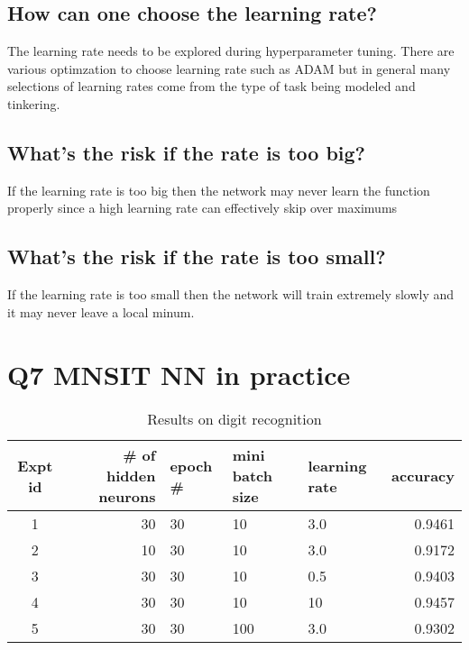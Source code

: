\documentclass[11pt]{article}
\begin{document}
\subsection{How can one choose the learning rate?}
The learning rate needs to be explored during hyperparameter tuning. There are various optimzation to choose learning rate such as ADAM but in general many selections of learning rates come from the type of task being modeled and tinkering.
\subsection{What's the risk if the rate is too big?}
If the learning rate is too big then the network may never learn the function properly since a high learning rate can effectively skip over maximums
\subsection{What's the risk if the rate is too small?}
If the learning rate is too small then the network will train extremely slowly and it may never leave a local minum.
\section{Q7 MNSIT NN in practice}
\begin{table}[h]
\centering
\caption{Results on digit recognition}
\label{table1}
\begin{tabular}{|c|r|l|l|l|r|} \hline
  Expt id & \# of hidden neurons & epoch \# & mini batch size & learning rate & accuracy \\ \hline
  1  & 30   & 30 & 10 & 3.0 & 0.9461 \\ \hline
  2  & 10   & 30 & 10 & 3.0 & 0.9172 \\ \hline
  3  & 30   & 30 & 10 & 0.5 & 0.9403 \\ \hline
  4  & 30   & 30 & 10 & 10  & 0.9457 \\ \hline       
  5  & 30   & 30 & 100 & 3.0 & 0.9302 \\ \hline       
\end{tabular}
\end{table}  
 
\end{document}
